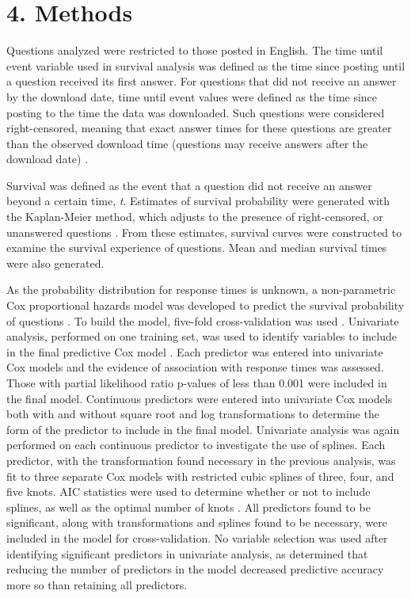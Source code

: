 \documentclass{article}
\begin{document}

\section*{4. Methods}

Questions analyzed were restricted to those posted in English. The time until event variable used in survival analysis was defined as the time since posting until a question received its first answer. For questions that did not receive an answer by the download date, time until event values were defined as the time since posting to the time the data was downloaded. Such questions were considered right-censored, meaning that exact answer times for these questions are greater than the observed download time (questions may receive answers after the download date) \cite{Kleinbaum2011}. 

Survival was defined as the event that a question did not receive an answer beyond a certain time, \textit{t}. Estimates of survival probability were generated with the Kaplan-Meier method, which adjusts to the presence of right-censored, or unanswered questions \cite{Bland1998}. From these estimates, survival curves were constructed to examine the survival experience of questions. Mean and median survival times were also generated. 

As the probability distribution for response times is unknown, a non-parametric Cox proportional hazards model was developed to predict the survival probability of questions \cite{Moore2010}. To build the model, five-fold cross-validation was used \cite{Rodriguez2010}. Univariate analysis, performed on one training set, was used to identify variables to include in the final predictive Cox model \cite{Hammermeister1979}. Each predictor was entered into univariate Cox models and the evidence of association with response times was assessed. Those with partial likelihood ratio p-values of less than 0.001 were included in the final model.  Continuous predictors were entered into univariate Cox models both with and without square root and log transformations to determine the form of the predictor to include in the final model. Univariate analysis was again performed on each continuous predictor to investigate the use of splines. Each predictor, with the transformation found necessary in the previous analysis, was fit to three separate Cox models with restricted cubic splines of three, four, and five knots. AIC statistics were used to determine whether or not to include splines, as well as the optimal number of knots \cite{Harrell2015}. All predictors found to be significant, along with transformations and splines found to be necessary, were included in the model for cross-validation. No variable selection was used after identifying significant predictors in univariate analysis, as \cite{Harrell2015} determined that reducing the number of predictors in the model decreased predictive accuracy more so than retaining all predictors. 
\end{document}
